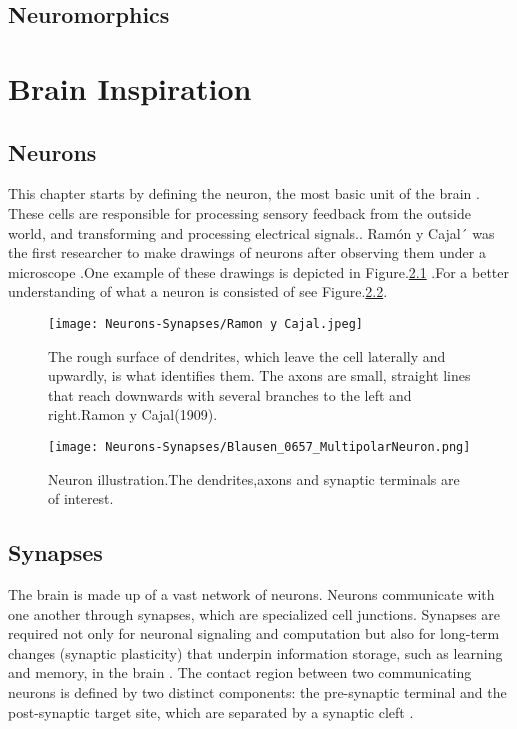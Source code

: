 \documentclass{report}
\begin{document}
\section{Neuromorphics}
\chapter{Brain Inspiration}
\section{Neurons}
This chapter starts by defining the neuron, the most basic unit of the brain \cite{gerstner2014}. These cells are responsible for processing sensory feedback from the outside world, and transforming and processing electrical signals.\cite{balduzzi2013}. Ramón y Cajal´ was the first researcher to make drawings of neurons after observing them under a microscope\cite{garcialopezp2010}
.One example of these drawings is depicted in Figure.\ref{fig:neurons-ramoncajal} .For a better understanding of what a neuron is consisted of see Figure.\ref{fig:neurons-multipolar}.
\begin{figure}[htp]
    \centering
    \texttt{[image: Neurons-Synapses/Ramon y Cajal.jpeg]}
    \caption{The rough surface of dendrites, which leave the cell laterally and upwardly, is what identifies them. The axons are small, straight lines that reach downwards with several branches to the left and right.Ramon y Cajal(1909).}
    \label{fig:neurons-ramoncajal}
\end{figure}
\begin{figure}[htp]
    \centering
    \texttt{[image: Neurons-Synapses/Blausen\_0657\_MultipolarNeuron.png]}
    \caption{Neuron illustration.The dendrites,axons and synaptic terminals are of interest.}
    \label{fig:neurons-multipolar}
\end{figure}
\section{Synapses}
The brain is made up of a vast network of neurons. Neurons communicate with one another through synapses, which are specialized cell junctions. Synapses are required not only for neuronal signaling and computation but also for long-term changes (synaptic plasticity) that underpin information storage, such as learning and memory, in the brain  \cite{li2003}. The contact region between two communicating neurons is defined by two distinct components: the pre-synaptic terminal and the post-synaptic target site, which are separated by a synaptic cleft .
\end{document}
